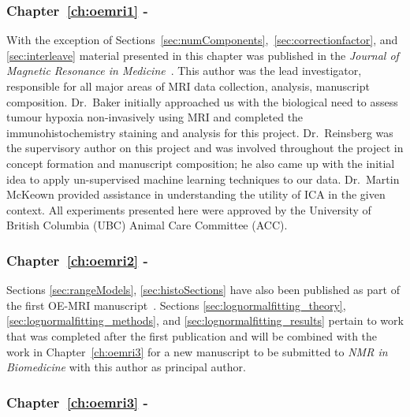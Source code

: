 \subsubsection{Chapter~\ref{ch:oemri1} - }

With the exception of Sections~\ref{sec:numComponents},~\ref{sec:correctionfactor}, and \ref{sec:interleave} material presented in this chapter was published in the \textit{Journal of Magnetic Resonance in Medicine}~\cite{Moosvi:2018ca}. 
This author was the lead investigator, responsible for all major areas of MRI data collection, analysis, manuscript composition. 
Dr.\ Baker initially approached us with the biological need to assess tumour hypoxia non-invasively using MRI and completed the immunohistochemistry staining and analysis for this project. 
Dr.\ Reinsberg was the supervisory author on this project and was involved throughout the project in concept formation and manuscript composition; he also came up with the initial idea to apply un-supervised machine learning techniques to our data. 
Dr.\ Martin McKeown provided assistance in understanding the utility of \ac{ICA} in the given context. 
All experiments presented here were approved by the University of British Columbia (UBC) Animal Care Committee (ACC).

\subsubsection{Chapter~\ref{ch:oemri2} - }
Sections \ref{sec:rangeModels}, \ref{sec:histoSections} have also been published as part of the first OE-MRI manuscript~\cite{Moosvi:2018ca}.
Sections \ref{sec:lognormalfitting_theory}, \ref{sec:lognormalfitting_methods}, and \ref{sec:lognormalfitting_results} pertain to work that was completed after the first publication and will be combined with the work in Chapter~\ref{ch:oemri3} for a new manuscript to be submitted to \textit{NMR in Biomedicine} with this author as principal author.


\subsubsection{Chapter~\ref{ch:oemri3} - }

